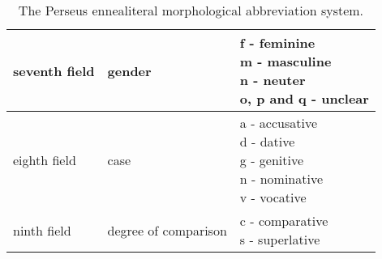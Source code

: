\begin{table}
\begin{tabular}{|l|l|l|}
           seventh field & gender & \specialcell{f - feminine\\m - masculine\\n - neuter\\ o, p and q - unclear} \\ \hline
            eighth field & case & \specialcell{a - accusative\\d - dative\\g - genitive\\n - nominative\\v - vocative} \\ \hline
             ninth field & degree of comparison & \specialcell{c - comparative\\s - superlative} \\ \hline
        \hline
    \end{tabular}
\caption{The Perseus ennealiteral morphological abbreviation system.} \label{table:perseusmorph}
\end{table}

